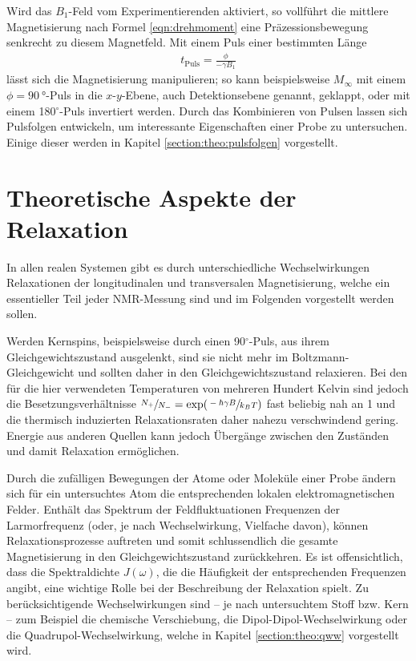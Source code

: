 Wird das $B_1$-Feld vom Experimentierenden aktiviert, so vollführt die mittlere Magnetisierung nach Formel \eqref{eqn:drehmoment} eine Präzessionsbewegung senkrecht zu diesem Magnetfeld. Mit einem Puls einer bestimmten Länge
\begin{align}
	t_\text{Puls} = \frac{\phi}{- \gamma B_1} \label{eqn:theo:pulslaenge}
\end{align}
lässt sich die Magnetisierung manipulieren; so kann beispielsweise $M_\infty$ mit einem $\phi = \SI{90}{\degree}$-Puls in die $x$-$y$-Ebene, auch Detektionsebene genannt, geklappt, oder mit einem 180$^\circ$-Puls invertiert werden. Durch das Kombinieren von Pulsen lassen sich Pulsfolgen entwickeln, um interessante Eigenschaften einer Probe zu untersuchen. Einige dieser werden in Kapitel \ref{section:theo:pulsfolgen} vorgestellt.



\section{Theoretische Aspekte der Relaxation} \label{section:theo:relax}

In allen realen Systemen gibt es durch unterschiedliche Wechselwirkungen Relaxationen der longitudinalen und transversalen Magnetisierung, welche ein essentieller Teil jeder NMR-Messung sind und im Folgenden vorgestellt werden sollen.

Werden Kernspins, beispielsweise durch einen 90$^\circ$-Puls, aus ihrem Gleichgewichtszustand ausgelenkt, sind sie nicht mehr im Boltzmann-Gleichgewicht und sollten daher in den Gleichgewichtszustand relaxieren. Bei den für die hier verwendeten Temperaturen von mehreren Hundert Kelvin sind jedoch die Besetzungsverhältnisse $\sfrac{N_+}{N_-} = \exp (\sfrac{- \hbar \gamma B}{k_B T})$ fast beliebig nah an 1 und die thermisch induzierten Relaxationsraten daher nahezu verschwindend gering. Energie aus anderen Quellen kann jedoch Übergänge zwischen den Zuständen und damit Relaxation ermöglichen.

Durch die zufälligen Bewegungen der Atome oder Moleküle einer Probe ändern sich für ein untersuchtes Atom die entsprechenden lokalen elektromagnetischen Felder. Enthält das Spektrum der Feldfluktuationen Frequenzen der Larmorfrequenz (oder, je nach Wechselwirkung, Vielfache davon), können Relaxationsprozesse auftreten und somit schlussendlich die gesamte Magnetisierung in den Gleichgewichtszustand zurückkehren. Es ist offensichtlich, dass die Spektraldichte $J(\omega)$, die die Häufigkeit der entsprechenden Frequenzen angibt, eine wichtige Rolle bei der Beschreibung der Relaxation spielt. Zu berücksichtigende Wechselwirkungen sind -- je nach untersuchtem Stoff bzw. Kern -- zum Beispiel die chemische Verschiebung, die Dipol-Dipol-Wechselwirkung oder die Quadrupol-Wechselwirkung, welche in Kapitel \ref{section:theo:qww} vorgestellt wird.

